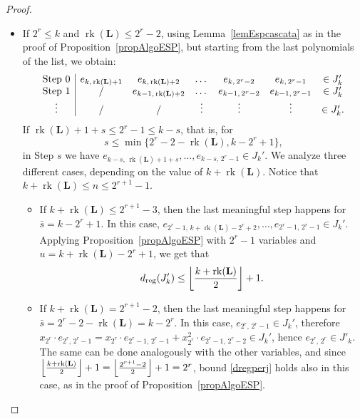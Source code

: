 \documentclass[11pt]{article}
\newcommand{\es}[2]{e_{#1,\, #2}}
\DeclarePairedDelimiter{\fl}{\lfloor}{\rfloor}
\theoremstyle{plain}
\theoremstyle{definition}
\theoremstyle{remark}
\begin{document}
\begin{proof}
\begin{itemize}
\item If $2^r\leq k$ and $\operatorname{rk}(\mathbf{L})\leq2^{r}-2$, using Lemma~\ref{lemEspcascata} as in the proof of Proposition~\ref{propAlgoESP}, but starting from the last polynomials of the list, we obtain:
\begin{equation*}
    \begin{array}{c | c c c c c c c c}
         \text{Step 0} & \es{k}{\operatorname{rk}(\mathbf{L})+1} & \es{k}{\operatorname{rk}(\mathbf{L})+2} & \dots & \es{k}{2^r-2} & \es{k}{2^r-1} & \in J_k'\\
         \text{Step 1} & / & \es{k-1}{\operatorname{rk}(\mathbf{L})+2} & \dots & \es{k-1}{2^r-2} & \es{k-1}{2^r-1} & \in J_k'\\
         \vdots & / & / & \vdots & \vdots & \vdots & \in J_k'.\\
    \end{array}
\end{equation*}
If $\operatorname{rk}(\mathbf{L})+1+s\leq 2^r-1\leq k-s$, that is, for
\begin{equation*}
    s\leq\min\{2^r-2-\operatorname{rk}(\mathbf{L}),k-2^r+1\},
\end{equation*} in Step $s$ we have $\es{k-s}{\operatorname{rk}(\mathbf{L})+1+s},\dots,\es{k-s}{2^r-1}\in J_k'$. We analyze three different cases, depending on the value of $k+\operatorname{rk}(\mathbf{L})$. Notice that $k+\operatorname{rk}(\mathbf{L})\leq n\leq 2^{r+1}-1$.
\begin{itemize}
\item If $k+\operatorname{rk}(\mathbf{L})\leq 2^{r+1}-3$, then the last meaningful step happens for $\bar s=k-2^r+1$. In this case,
$\es{2^r-1}{k+\operatorname{rk}(\mathbf{L})-2^r+2},\dots,\es{2^r-1}{2^r-1}\in J_k'$. Applying Proposition~\ref{propAlgoESP} with $2^r-1$ variables and $u=k+\operatorname{rk}(\mathbf{L})-2^r+1$, we get that
$$d_{\operatorname{reg}}(J_k')\leq\fl*{\frac{k+\operatorname{rk}(\mathbf{L})}{2}}+1.
$$
\item If $k+\operatorname{rk}(\mathbf{L})=2^{r+1}-2$, then the last meaningful step happens for $\bar s=2^r-2-\operatorname{rk}(\mathbf{L})=k-2^r$.
In this case, $\es{2^r}{2^r-1}\in J_k'$, therefore $x_{2^r}\cdot\es{2^r}{2^r-1}=x_{2^r}\cdot\es{2^r-1}{2^r-1}+x_{2^r}^2\cdot\es{2^r-1}{2^r-2}\in J_k'$, hence $\es{2^r}{2^r}\in J'_k$. The same can be done analogously with the other variables, and since $\fl*{\frac{k+\operatorname{rk}(\mathbf{L})}{2}}+1=\fl*{\frac{2^{r+1}-2}{2}}+1=2^r$, bound \eqref{dregperj} holds also in this case, as in the proof of Proposition~\ref{propAlgoESP}.

\end{itemize}
\end{itemize}
\end{proof}
\end{document}
